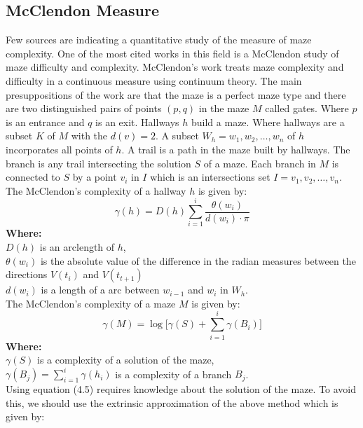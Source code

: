 \subsection{McClendon Measure}
Few sources are indicating a quantitative study of the measure of maze complexity. One of the most cited works in this field is a McClendon \textcolor{black}{\cite{14}} study of maze difficulty and complexity. 
McClendon’s work treats maze complexity and difficulty in a continuous measure using continuum theory. The main presuppositions of the work are that the maze is a perfect maze type and there are two distinguished pairs of points $(p,q)$ in the maze $M$ called gates. Where $p$ is an entrance and $q$ is an exit.  Hallways  $h$ build a maze. 
Where hallways are a subset $K$ of $M$ with the \textcolor{black}{$d(v) = 2$}. A subset $W_h = {w_1,w_2,\ldots, w_n}$ of $h$ incorporates all points of $h$. 
A trail is a path in the maze built by hallways. The branch is any trail intersecting the solution $S$ of a maze. Each branch in $M$ is connected to $S$ by a point $v_i$ in $I$ which is an intersections set $I = {v_1,v_2,\dots, v_n}$. The McClendon’s complexity of a hallway $h$ is given by:\\
\begin{equation}
\gamma(h) = D(h)\sum_{i = 1}^{i} \frac{\theta(w_i)}{d(w_i)\cdot \pi}
\end{equation}
\textbf{Where:}\\
$D(h)$ is an arclength of $h$,\\ 
$\theta(w_i)$ is the absolute value of the difference in the radian measures between the directions $V(t_i)$ and $V(t_{t+1})$\\ 
$d(w_i)$ is a length of a arc between $w_{i-1}$ and $w_i$ in $W_h$.\\ 
\newline
The McClendon’s complexity of a maze $M$ is given by:\\
\begin{equation}
\gamma(M)=\log\bigl[\gamma(S) + \sum_{i = 1}^{i} \gamma(B_i) \bigr]
\end{equation}
\textbf{Where:}\\
$\gamma(S)$ is a complexity of a solution of the maze,\\
$\gamma(B_j) = \sum_{i = 1}^{i} \gamma(h_i)$ is a complexity of a branch $B_j$.\\
\newline 
Using equation (4.5) requires knowledge about the solution of the maze. To avoid this, we should use the extrinsic approximation of the above method which is given by:\\
